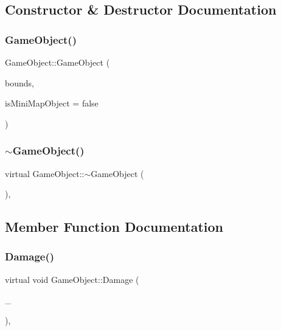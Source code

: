 \subsection{Constructor \& Destructor Documentation}
\hypertarget{class_game_object_aede2e0cfea6141c4fe0c8413e364d05a}{}\label{class_game_object_aede2e0cfea6141c4fe0c8413e364d05a} 
\subsubsection{\texorpdfstring{Game\+Object()}{GameObject()}}
{\footnotesize\ttfamily Game\+Object\+::\+Game\+Object (\begin{DoxyParamCaption}\item[{sf\+::\+Float\+Rect}]{bounds,  }\item[{bool}]{is\+Mini\+Map\+Object = {\ttfamily false} }\end{DoxyParamCaption})\hspace{0.3cm}{\ttfamily [inline]}}

\hypertarget{class_game_object_a224d4f6d9dd75c8a6f9d022eaf586fd9}{}\label{class_game_object_a224d4f6d9dd75c8a6f9d022eaf586fd9} 
\subsubsection{\texorpdfstring{$\sim$\+Game\+Object()}{~GameObject()}}
{\footnotesize\ttfamily virtual Game\+Object\+::$\sim$\+Game\+Object (\begin{DoxyParamCaption}{ }\end{DoxyParamCaption})\hspace{0.3cm}{\ttfamily [inline]}, {\ttfamily [virtual]}}



\subsection{Member Function Documentation}
\hypertarget{class_game_object_a1c5da37ca4c3e7d2bfa8970eb9b5202d}{}\label{class_game_object_a1c5da37ca4c3e7d2bfa8970eb9b5202d} 
\subsubsection{\texorpdfstring{Damage()}{Damage()}}
{\footnotesize\ttfamily virtual void Game\+Object\+::\+Damage (\begin{DoxyParamCaption}\item[{float}]{\+\_\+ }\end{DoxyParamCaption})\hspace{0.3cm}{\ttfamily [inline]}, {\ttfamily [virtual]}}



